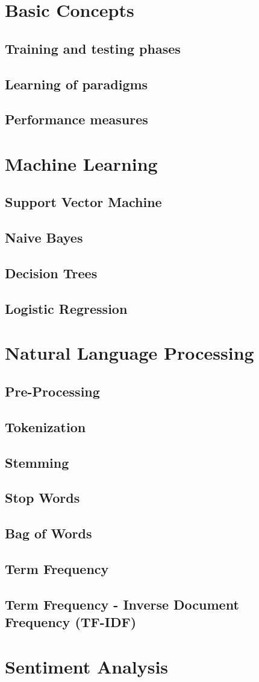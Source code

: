 \section{Basic Concepts}
  \subsection{Training and testing phases}
  \subsection{Learning of paradigms}
  \subsection{Performance measures}

\section{Machine Learning}
  \subsection{Support Vector Machine}
  \subsection{Naive Bayes}
  \subsection{Decision Trees}
  \subsection{Logistic Regression}

\section{Natural Language Processing}
  \subsection{Pre-Processing}
  \subsection{Tokenization}
  \subsection{Stemming}
  \subsection{Stop Words}
  \subsection{Bag of Words}
  \subsection{Term Frequency}
  \subsection{Term Frequency - Inverse Document Frequency (TF-IDF)}

\section{Sentiment Analysis}

